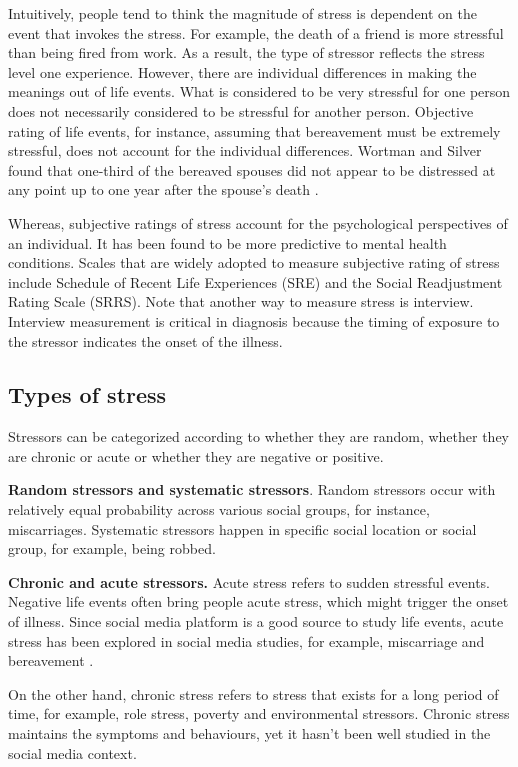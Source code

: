 Intuitively, people tend to think the magnitude of stress is dependent on the event that invokes the stress. For example, the death of a friend is more stressful than being fired from work. As a result, the type of stressor reflects the stress level one experience. However, there are individual differences in making the meanings out of life events. What is considered to be very stressful for one person does not necessarily considered to be stressful for another person. Objective rating of life events, for instance, assuming that bereavement must be extremely stressful, does not account for the individual differences.  Wortman and Silver found that one-third of the bereaved spouses did not appear to be distressed at any point up to one year after the spouse's death \cite{wortman1989myths}. 

Whereas, subjective ratings of stress account for the psychological perspectives of an individual. It has been found to be more predictive to mental health conditions. Scales that are widely adopted to measure subjective rating of stress include Schedule of Recent Life Experiences (SRE) \cite{nuckolls1972psychosocial} and the Social Readjustment Rating Scale (SRRS). Note that another way to measure stress is interview. Interview measurement is critical in diagnosis because the timing of exposure to the stressor indicates the onset of the illness.

\subsection{Types of stress}
Stressors can be categorized according to whether they are random, whether they are chronic or acute or whether they are negative or positive. 

\textbf{Random stressors and systematic stressors}. Random stressors occur with relatively equal probability across various social groups, for instance, miscarriages. Systematic stressors happen in specific social location or social group, for example, being robbed. 

\textbf{Chronic and acute stressors.}  Acute stress refers to sudden stressful events. Negative life events often bring people acute stress, which might trigger the onset of illness. Since social media platform is a good source to study life events, acute stress has been explored in social media studies, for example, miscarriage \cite{andalibi_announcing_2018} and bereavement \cite{brubaker2012grief}.

On the other hand, chronic stress refers to stress that exists for a long period of time, for example, role stress, poverty and environmental stressors. Chronic stress maintains the symptoms and behaviours, yet it hasn't been well studied in the social media context.

